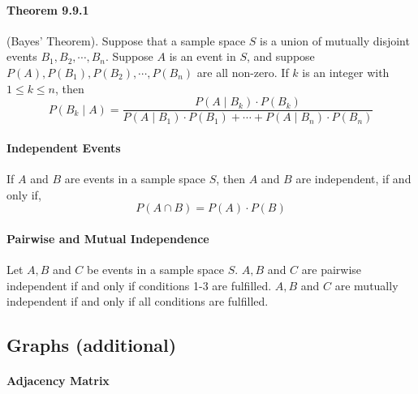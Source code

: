 \documentclass[a4paper]{article}
\begin{document}
\begin{multicols*}{3}
      \paragraph{Theorem 9.9.1} (Bayes' Theorem). Suppose that a sample space $S$ is a union of mutually disjoint events $B_1, B_2, \cdots, B_n$. Suppose $A$ is an event in $S$, and suppose $P(A), P(B_1), P(B_2), \cdots, P(B_n)$ are all non-zero. If $k$ is an integer with $1 \leq k \leq n$, then
        \begin{equation*}
          P(B_k \;\vert\; A) = \dfrac{P(A \;\vert\; B_k) \cdot P(B_k)}{P(A \;\vert\; B_1) \cdot P(B_1) + \cdots + P(A \;\vert\; B_n) \cdot P(B_n)}
        \end{equation*}
      \paragraph{Independent Events} If $A$ and $B$ are events in a sample space $S$, then $A$ and $B$ are independent, if and only if,
        \begin{equation*}
          P(A \cap B) = P(A) \cdot P(B)
        \end{equation*}
      \paragraph{Pairwise and Mutual Independence} Let $A, B$ and $C$ be events in a sample space $S$. $A, B$ and $C$ are pairwise independent if and only if conditions 1-3 are fulfilled. $A, B$ and $C$ are mutually independent if and only if all conditions are fulfilled.
  \subsection*{Graphs (additional)}
    \paragraph{Adjacency Matrix}

\end{multicols*}
\end{document}

